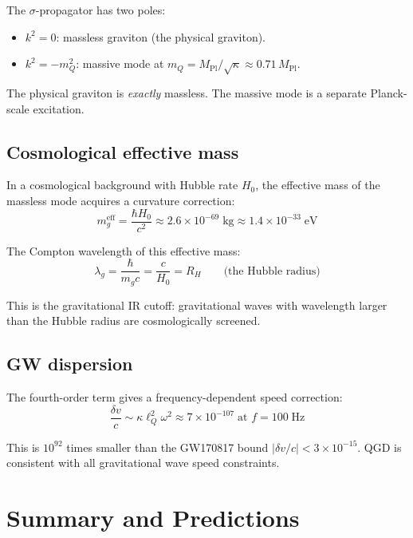 \documentclass[11pt,a4paper]{article}
\theoremstyle{plain}
\theoremstyle{definition}
\theoremstyle{remark}
\newcommand{\lQ}{\ell_Q}
\newcommand{\mQ}{m_Q}
\newcommand{\Mpl}{M_{\mathrm{Pl}}}
\begin{document}
The $\sigma$-propagator has two poles:
\begin{itemize}
  \item $k^2 = 0$: massless graviton (the physical graviton).
  \item $k^2 = -\mQ^2$: massive mode at $\mQ = \Mpl/\sqrt\kappa \approx 0.71\,\Mpl$.
\end{itemize}

The physical graviton is \emph{exactly} massless.  The massive mode is a separate Planck-scale excitation.

\subsection{Cosmological effective mass}

In a cosmological background with Hubble rate $H_0$, the effective mass of the massless mode acquires a curvature correction:
\begin{equation}
  m_g^{\mathrm{eff}} = \frac{\hbar H_0}{c^2} \approx 2.6\times10^{-69}\;\mathrm{kg} \approx 1.4\times10^{-33}\;\mathrm{eV}
\end{equation}

The Compton wavelength of this effective mass:
\begin{equation}
  \lambda_g = \frac{\hbar}{m_g c} = \frac{c}{H_0} = R_H \qquad\text{(the Hubble radius)}
\end{equation}

This is the gravitational IR cutoff: gravitational waves with wavelength larger than the Hubble radius are cosmologically screened.

\subsection{GW dispersion}

The fourth-order term gives a frequency-dependent speed correction:
\begin{equation}
  \frac{\delta v}{c} \sim \kappa\lQ^2\omega^2 \approx 7\times10^{-107}\;\text{at }f = 100\;\text{Hz}
\end{equation}

This is $10^{92}$ times smaller than the GW170817 bound $|\delta v/c| < 3\times10^{-15}$.  QGD is consistent with all gravitational wave speed constraints.

\section{Summary and Predictions}
\label{sec:summary}
\end{document}
